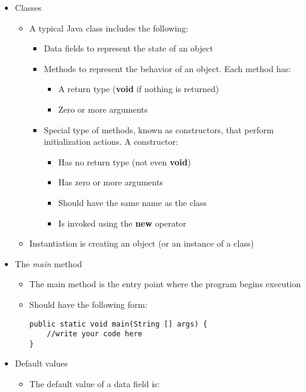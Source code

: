 \documentclass[11pt]{article}
\begin{document}
\begin{itemize}
	\item Classes
		\begin{itemize}
			\item A typical Java class includes the following:
				\begin{itemize}
					\item Data fields to represent the state of an object
					\item Methods to represent the behavior of an object. Each method has:
						\begin{itemize}
							\item A return type (\textbf{void} if nothing is returned)
							\item Zero or more arguments
						\end{itemize}
					\item Special type of methods, known as constructors, that perform initialization actions. A constructor:
						\begin{itemize}
							\item Has no return type (not even \textbf{void})
							\item Has zero or more arguments
							\item Should have the same name as the class
							\item Is invoked using the \textbf{new} operator
						\end{itemize}
				\end{itemize}
			\item Instantiation is creating an object (or an instance of a class)
		\end{itemize}

	\item The \textit{main} method
		\begin{itemize}
			\item The main method is the entry point where the program begins
			execution
			\item Should have the following form:
				\begin{Verbatim}
public static void main(String [] args) {
	//write your code here
}
				\end{Verbatim}
		\end{itemize}

	\item Default values
		\begin{itemize}
			\item The default value of a data field is:
\end{itemize}
\end{itemize}
\end{document}

